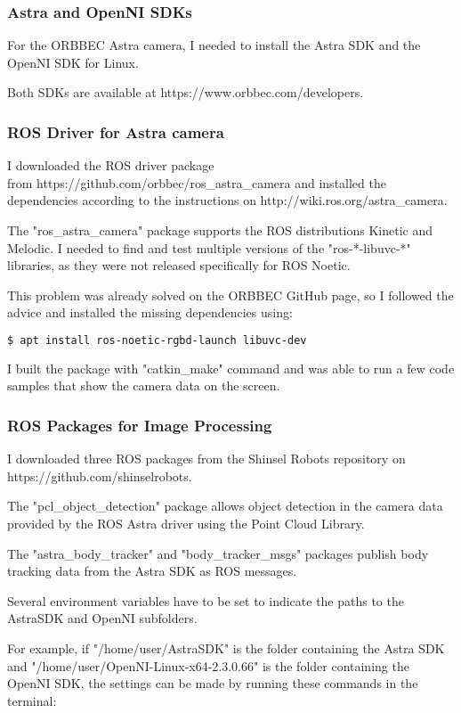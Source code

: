 \subsubsection{Astra and OpenNI SDKs}
For the ORBBEC Astra camera, I needed to install the Astra SDK and the OpenNI SDK for Linux.\par
Both SDKs are available at https://www.orbbec.com/developers.\par

\subsubsection{ROS Driver for Astra camera}
I downloaded the ROS driver package\\
from https://github.com/orbbec/ros\_astra\_camera and installed the dependencies according to the instructions on http://wiki.ros.org/astra\_camera.\par
The "ros\_astra\_camera" package supports the ROS distributions Kinetic and Melodic. I needed to find and test multiple versions of the "ros-*-libuvc-*" libraries, as they were not released specifically for ROS Noetic.\par
This problem was already solved on the ORBBEC GitHub page, so I followed the advice and installed the missing dependencies using:\par

\begin{lstlisting}[language=bash]
  $ apt install ros-noetic-rgbd-launch libuvc-dev
\end{lstlisting}


I built the package with "catkin\_make" command and was able to run a few code samples that show the camera data on the screen.\par

\subsubsection{ROS Packages for Image Processing}
I downloaded three ROS packages from the Shinsel Robots repository on https://github.com/shinselrobots.\par
The "pcl\_object\_detection" package allows object detection in the camera data provided by the ROS Astra driver using the Point Cloud Library.\par
The "astra\_body\_tracker" and "body\_tracker\_msgs" packages publish body tracking data from the Astra SDK as ROS messages.\par
Several environment variables have to be set to indicate the paths to the AstraSDK and OpenNI subfolders.\par
For example, if "/home/user/AstraSDK" is the folder containing the Astra SDK and "/home/user/OpenNI-Linux-x64-2.3.0.66" is the folder containing the OpenNI SDK, the settings can be made by running these commands in the terminal: \par

